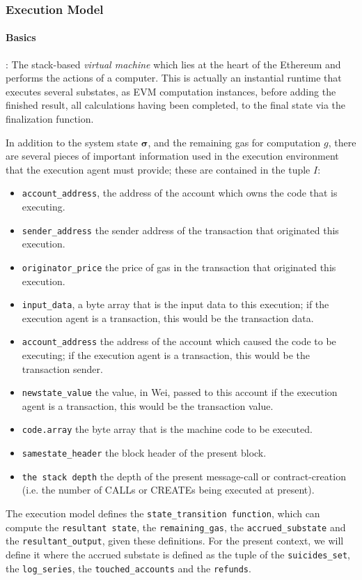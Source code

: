 \documentclass[10pt,a4paper,leqno,bibliography=totoc]{scrartcl}
\newenvironment{alphafootnotes}
{\par\edef\savedfootnotenumber{\number\value{footnote}}
\renewcommand{\thefootnote}{\alph{footnote}}
\setcounter{footnote}{0}}
{\par\setcounter{footnote}{\savedfootnotenumber}}
\begin{document}
\begin{alphafootnotes}
\begin{multicols*}{2}
	
			\subsubsection{Execution Model}
				\paragraph{Basics}: The stack-based \textsl{virtual machine} which lies at the heart of the Ethereum and performs the actions of a computer. This is actually an instantial runtime that executes several substates, as EVM computation instances, before adding the finished result, all calculations having been completed, to the final state  via the finalization function.  
	
				In addition to the system state $\boldsymbol{\sigma}$, and the remaining gas for computation $g$, there are several pieces of important information used in the execution environment that the execution agent must provide; these are contained in the tuple $I$:

				\begin{itemize}
					\item \texttt{account\_address}, the address of the account which owns the code that is executing.
					\item \texttt{sender\_address} the sender address of the transaction that originated this execution.
					\item \texttt{originator\_price} the price of gas in the transaction that originated this execution.
					\item \texttt{input\_data}, a byte array that is the input data to this execution; if the execution agent is a transaction, this would be the transaction data.
					\item \texttt{account\_address}  the address of the account which caused the code to be executing; if the execution agent is a transaction, this would be the transaction sender.
					\item \texttt{newstate\_value} the value, in Wei, passed to this account if the execution agent is a transaction, this would be the transaction value.\supercite{Wood2017}
					\item \texttt{code.array} the byte array that is the machine code to be executed.\supercite{Wood2017}
					\item \texttt{samestate\_header} the block header of the present block.
					\item \texttt{the stack depth} the depth of the present message-call or contract-creation (i.e. the number of {\small CALL}s or {\small CREATE}s being executed at present).\supercite{Wood2017}
				\end{itemize}
				The execution model defines the \texttt{state\_transition function}, which can compute the \texttt{resultant state}, the \texttt{remaining\_gas}, the \texttt{accrued\_substate} and the \texttt{resultant\_output}, given these definitions. For the present context, we will define it where the accrued substate is defined as the tuple of the \texttt{suicides\_set}, the \texttt{log\_series}, the \texttt{touched\_accounts} and the \texttt{refunds}.
				

\end{multicols*}
\end{alphafootnotes}
\end{document}
